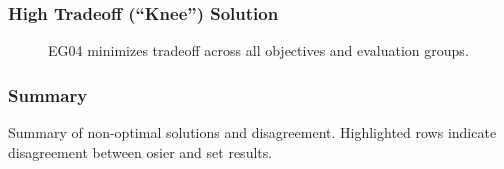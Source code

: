 \begin{frame}
  \frametitle{High Tradeoff (``Knee'') Solution}
        
  \begin{figure}[htbp!]
    \begin{center}
      \resizebox{0.9\columnwidth}{!}{}
    \end{center}
          \caption{EG04 minimizes tradeoff across all objectives and evaluation groups.}
    \label{fig:single-eg-pcp}
  \end{figure}
\end{frame}

\begin{frame}
  \frametitle{Summary}
    \begin{table}
        \centering
        \caption{Summary of non-optimal solutions and disagreement. Highlighted
        rows indicate disagreement between \Gls{osier} and \Gls{set} results.}
        \label{tab:non-optimal-subset}
        \resizebox{\columnwidth}{!}{}
    \end{table}
\end{frame}
